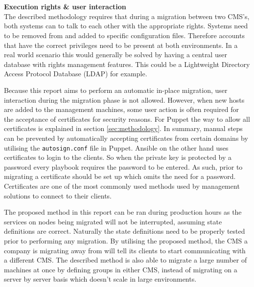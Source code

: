 \\\\
\noindent
\textbf{Execution rights \& user interaction}\\
The described methodology requires that during a migration between two CMS's, both systems can to talk to each other with the appropriate rights. Systems need to be removed from and added to specific configuration files. Therefore accounts that have the correct privileges need to be present at both environments. In a real world scenario this would generally be solved by having a central user database with rights management features. This could be a Lightweight Directory Access Protocol Database (LDAP) for example. 

Because this report aims to perform an automatic in-place migration, user interaction during the migration phase is not allowed. However, when new hosts are added to the management machines, some user action is often required for the acceptance of certificates for security reasons. For Puppet the way to allow all certificates is explained in section \ref{sec:methodology}. In summary, manual steps can be prevented by automatically accepting certificates from certain domains by utilising the \texttt{autosign.conf} file in Puppet. Ansible on the other hand uses certificates to login to the clients. So when the private key is protected by a password every playbook requires the password to be entered. As such, prior to migrating a certificate should be set up which omits the need for a password. Certificates are one of the most commonly used methods used by management solutions to connect to their clients. 

The proposed method in this report can be ran during production hours as the services on nodes being migrated will not be interrupted, assuming state definitions are correct. Naturally the state definitions need to be properly tested prior to performing any migration. By utilising the proposed method, the CMS a company is migrating away from will tell its clients to start communicating with a different CMS. The described method is also able to migrate a large number of machines at once by defining groups in either CMS, instead of migrating on a server by server basis which doesn't scale in large environments.

